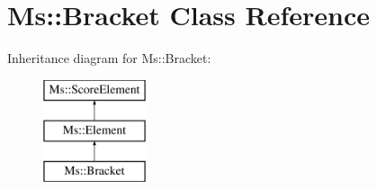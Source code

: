 \hypertarget{class_ms_1_1_bracket}{}\section{Ms\+:\+:Bracket Class Reference}
\label{class_ms_1_1_bracket}
Inheritance diagram for Ms\+:\+:Bracket\+:\begin{figure}[H]
\begin{center}
\leavevmode
\includegraphics[height=3.000000cm]{class_ms_1_1_bracket}
\end{center}
\end{figure}
